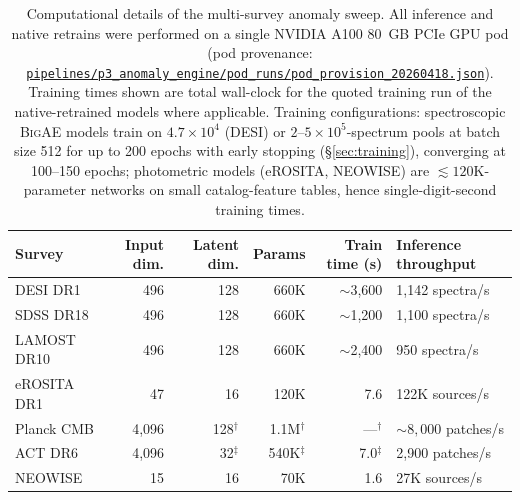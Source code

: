 \documentclass[aps,prd,twocolumn,superscriptaddress,showpacs,preprintnumbers,nofootinbib,longbibliography,floatfix]{revtex4-2}
\newcommand{\repoBase}{https://github.com/Hubify-Projects/bigbounce/blob/main}
\newcommand{\artifact}[1]{\href{\repoBase/#1}{\nolinkurl{#1}}}
\newcommand{\BigAE}{\textsc{BigAE}}
\begin{document}
\begin{table}[tb]
\caption{\label{tab:processing} Computational details of the multi-survey anomaly sweep. All inference and native retrains were performed on a single NVIDIA A100 80~GB PCIe GPU pod (pod provenance: \artifact{pipelines/p3\_anomaly\_engine/pod\_runs/pod\_provision\_20260418.json}). Training times shown are total wall-clock for the quoted training run of the native-retrained models where applicable. Training configurations: spectroscopic \BigAE{} models train on $4.7\times10^4$ (DESI) or $2$--$5\times10^5$-spectrum pools at batch size 512 for up to 200 epochs with early stopping (\S\ref{sec:training}), converging at 100--150 epochs; photometric models (eROSITA, NEOWISE) are ${\lesssim}120$K-parameter networks on small catalog-feature tables, hence single-digit-second training times.}
\begin{ruledtabular}
\begin{tabular}{lrrrrl}
\textbf{Survey} & \textbf{Input dim.} & \textbf{Latent dim.} & \textbf{Params} & \textbf{Train time (s)} & \textbf{Inference throughput} \\
\hline
DESI DR1      & 496   & 128 & 660K  & $\sim$3{,}600 & 1{,}142 spectra/s \\
SDSS DR18     & 496   & 128 & 660K  & $\sim$1{,}200 & 1{,}100 spectra/s \\
LAMOST DR10   & 496   & 128 & 660K  & $\sim$2{,}400 & 950 spectra/s \\
eROSITA DR1   & 47    & 16  & 120K  & 7.6           & 122K sources/s \\
Planck CMB    & 4{,}096 & 128$^\dagger$ & 1.1M$^\dagger$ & ---$^\dagger$ & ${\sim}8{,}000$ patches/s \\
ACT DR6       & 4{,}096 & 32$^\ddagger$ & 540K$^\ddagger$ & 7.0$^\ddagger$ & 2{,}900 patches/s \\
NEOWISE       & 15    & 16  & 70K   & 1.6           & 27K sources/s \\
\end{tabular}
\end{ruledtabular}
\begin{flushleft}
{\footnotesize
}
\end{flushleft}
\end{table}
\end{document}
